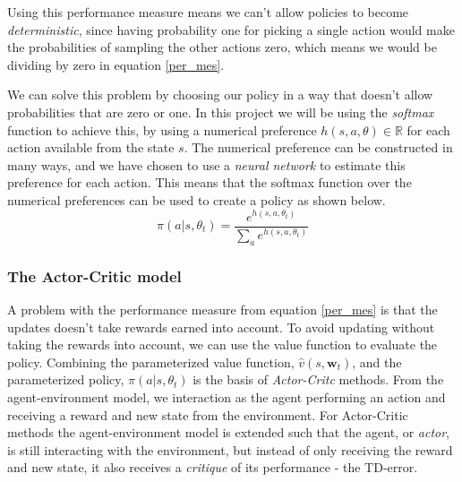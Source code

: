 \documentclass[11pt]{article}
\begin{document}
Using this performance measure means we can't allow policies to become \textit{deterministic},
since having probability one for picking a single action would make the probabilities
of sampling the other actions zero, which means we would be dividing by zero
in equation \ref{per_mes}.

We can solve this problem by choosing our policy in a way that doesn't allow probabilities that are zero or one.
In this project we will be using the \textit{softmax} function to achieve this,
by using a numerical preference $h(s, a, \theta) \in \mathbb{R}$
for each action available from the state $s$.
The numerical preference can be constructed in many ways, and we have chosen to use
a \textit{neural network} to estimate this preference for each action.
This means that the softmax function over the numerical preferences can be used to create a policy
as shown below. 
\begin{equation}\label{eq:soft_max}
    \pi(a | s, \theta_t) = \frac{e^{h(s,a,\theta_t)}}{\sum\limits_{a} e^{h(s,a,\theta_t)}}
\end{equation}

\subsubsection{The Actor-Critic model}\label{sec:actor_critic}

A problem with the performance measure from equation \ref{per_mes} is that
the updates doesn't take rewards earned into account. 
To avoid updating without taking the rewards into account, we can
use the value function to evaluate the policy.
Combining the parameterized value function, $\hat{v}(s, \mathbf{w}_t)$,
and the parameterized policy, $\pi(a|s, \theta_t)$ is the basis of \textit{Actor-Critc} methods.
From the agent-environment model, we interaction as the agent performing an action
and receiving a reward and new state from the environment.
For Actor-Critic methods the agent-environment model is extended such that the agent,
or \textit{actor}, is still interacting with the environment, but
instead of only receiving the reward and new state, it also receives
a \textit{critique} of its performance - the TD-error.
\end{document}
